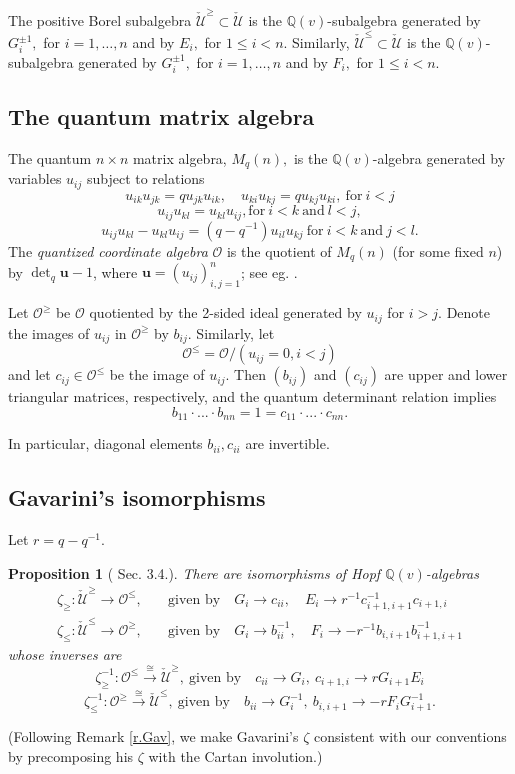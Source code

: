 \documentclass[11pt]{amsart}
\theoremstyle{plain}
\newtheorem{proposition}[theorem]{Proposition}
\theoremstyle{definition}
\newcommand{\beq}{\begin{equation}}
\newcommand{\eeq}{\end{equation}}
\newcommand{\bpro}{\begin{proposition}}
\newcommand{\epro}{\end{proposition}}
\def\BQ{\mathbb Q}
\def\Qv{{\BQ(v)}}
\def\Uc{{\check {\mathcal U}}}
\def\O{{\mathcal O}}
\def\buu{{\mathbf  u}}
\begin{document}
\def\Op{{\O^{\ge}}}
\def\On{{\O^{\le}}}

The positive Borel subalgebra $\Uc^{\ge }\subset \Uc$ is the $\Qv$-subalgebra generated by $G_i^{\pm 1},$ for $i=1, \dots , n$ and by $E_i,$ for $1\le i< n$. Similarly, $\Uc^{\le}\subset \Uc$ is the $\Qv$-subalgebra generated by $G_i^{\pm 1},$ for $i=1, \dots , n$ and by $F_i,$ for $1\le i<  n$.
 
\subsection{The quantum matrix algebra}

 The quantum $n\times n$ matrix algebra, $M_q(n),$ is the $\Qv$-algebra generated by variables $u_{ij}$ subject to relations
 \beq\label{e.matrix1}
 u_{ik}u_{jk}=q  u_{jk}u_{ik},\quad u_{ki}u_{kj}=q  u_{kj}u_{ki},\ \text{for}\ i<j
 \eeq
 \beq\label{e.matrix2}
 u_{ij}u_{kl}= u_{kl}u_{ij}, \text{for}\ i<k\ \text{and}\ l<j,
 \eeq
 \beq\label{e.matrix3}
 u_{ij}u_{kl}-u_{kl}u_{ij}=(q-q^{-1})u_{il}u_{kj}\ \text{for}\ i<k\ \text{and}\ j<l.
\eeq 
The {\em quantized coordinate algebra} $\O$ is the quotient of $M_q(n)$ (for some fixed $n$) by
$\det_q \buu-1$, where $\buu=(u_{ij})_{i,j=1}^n$; see eg. \cite{KS}. 

 {}
 Let $\Op$ be $\O$ quotiented by the 2-sided ideal generated by $u_{ij}$ for $i >j$. Denote the images of $u_{ij}$ in $\Op$ by $b_{ij}.$ Similarly, let 
  $$\On= \O/ ( u_{ij}=0, i <j)$$ 
  and let $c_{ij}\in \On$ be the image of $u_{ij}$. Then $(b_{ij})$ and $(c_{ij})$ are upper and lower triangular matrices, respectively, and the quantum determinant relation implies
 \beq\label{e.proddiag}
b_{11}\cdot ...\cdot b_{nn}=1=c_{11}\cdot ...\cdot c_{nn}.
\eeq

In particular, diagonal elements $b_{ii},c_{ii}$ are invertible.

\subsection{Gavarini's isomorphisms}

Let $r=q-q^{-1}$.
 
\bpro[\cite{Gavarini2} Sec. 3.4.]\label{p.Gavarini}  
 There are isomorphisms of Hopf $\Qv$-algebras 
\begin{align}
\zeta_\geq: \Uc^{\ge} \to  \On,\quad & \text{given by}\quad  G_i\to c_{ii}, \quad E_i\to r^{-1}c_{i+1,i+1}^{-1}c_{i+1,i}\label{e.zeta_leq}\\
\zeta_\leq: \Uc^{\le} \to  \Op,\quad  & \text{given by}\quad  G_i\to b_{ii}^{-1}, \quad  F_i\to -r^{-1}b_{i,i+1}b_{i+1,i+1}^{-1}\label{e.zeta_geq}
\end{align}
whose inverses are
$$\zeta_{\geq}^{-1}: \On \xrightarrow{\cong}  \Uc^{\ge},\ \text{given by}\quad  c_{ii} \to G_i, \ c_{i+1,i} \to r G_{i+1}E_i$$
$$\zeta_{\leq}^{-1}: \Op \xrightarrow{\cong}  \Uc^{\le},\ \text{given by}\quad   b_{ii} \to G_i^{-1}, \ b_{i,i+1} \to -r F_i  G_{i+1}^{-1}.$$
\epro
(Following Remark \ref{r.Gav}, we make Gavarini's $\zeta$ consistent with our conventions by precomposing his $\zeta$ with the Cartan involution.) 
\end{document}
